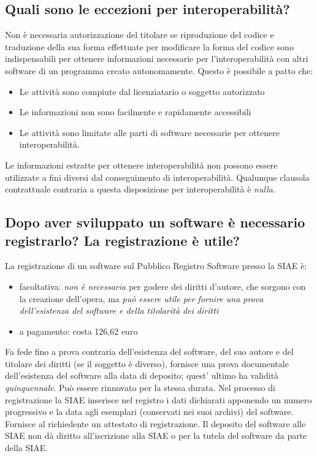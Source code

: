 \subsection{Quali sono le eccezioni per interoperabilità?}
Non è necessaria autorizzazione del titolare se riproduzione del codice e traduzione della sua forma effettuate per modificare la forma del codice
sono indispensabili per ottenere informazioni necessarie per l'interoperabilità con altri software di un programma creato
autonomamente. Questo è possibile a patto che:
\begin{itemize}
    \item Le attività sono compiute dal licenziatario o soggetto autorizzato
    \item Le informazioni non sono facilmente e rapidamente accessibili
    \item Le attività sono limitate alle parti di software necessarie per ottenere interoperabilità.
\end{itemize}
Le informazioni estratte per ottenere interoperabilità non possono essere utilizzate a fini diversi dal conseguimento di interoperabilità. Qualunque clausola contrattuale
contraria a questa disposizione per interoperabilità è \emph{nulla}.

\subsection{Dopo aver sviluppato un software è necessario registrarlo? La registrazione è utile?}
La registrazione di un software sul Pubblico Registro Software presso la SIAE è:
\begin{itemize}
    \item facoltativa: \emph{non è necessaria} per godere dei diritti d'autore, che sorgono con la creazione dell'opera,
    ma \emph{può essere utile per fornire una prova dell'esistenza del software e della titolarità dei diritti}
    \item a pagamento: costa 126,62 euro
\end{itemize}
Fa fede fino a prova contraria dell'esistenza del software, del suo autore e del titolare dei diritti (se il soggetto è diverso),
fornisce una prova documentale dell'esistenza del software alla data di deposito; quest' ultimo ha validità \emph{quinquennale}. Può
essere rinnovato per la stessa durata.\newline
Nel processo di registrazione la SIAE inserisce nel registro i dati dichiarati apponendo un numero progressivo e la data agli esemplari (conservati nei suoi archivi)
del software. Fornisce al richiedente un attestato di registrazione.\newline
Il deposito del software alle SIAE non dà diritto all'iscrizione alla SIAE o per la tutela del software
da parte della SIAE.

